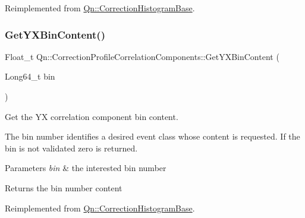 Reimplemented from \mbox{\hyperlink{classQn_1_1CorrectionHistogramBase_ae7dada656dda33ba9adca7bcbd78f4d2}{Qn\+::\+Correction\+Histogram\+Base}}.

\mbox{\label{classQn_1_1CorrectionProfileCorrelationComponents_a5bf66dc908aa51c9b7661a69023dd946}} 
\subsubsection{\texorpdfstring{Get\+Y\+X\+Bin\+Content()}{GetYXBinContent()}}
{\footnotesize\ttfamily Float\+\_\+t Qn\+::\+Correction\+Profile\+Correlation\+Components\+::\+Get\+Y\+X\+Bin\+Content (\begin{DoxyParamCaption}\item[{Long64\+\_\+t}]{bin }\end{DoxyParamCaption})\hspace{0.3cm}{\ttfamily [virtual]}}

Get the YX correlation component bin content.

The bin number identifies a desired event class whose content is requested. If the bin is not validated zero is returned.


\begin{DoxyParams}{Parameters}
{\em bin} & the interested bin number \\
\hline
\end{DoxyParams}
\begin{DoxyReturn}{Returns}
the bin number content 
\end{DoxyReturn}


Reimplemented from \mbox{\hyperlink{classQn_1_1CorrectionHistogramBase_a2bc9c26889a5ff0479f5638e2e253174}{Qn\+::\+Correction\+Histogram\+Base}}.

\mbox{\label{classQn_1_1CorrectionProfileCorrelationComponents_a91f05094196842c16be6f6fc2bb7dad8}} 
